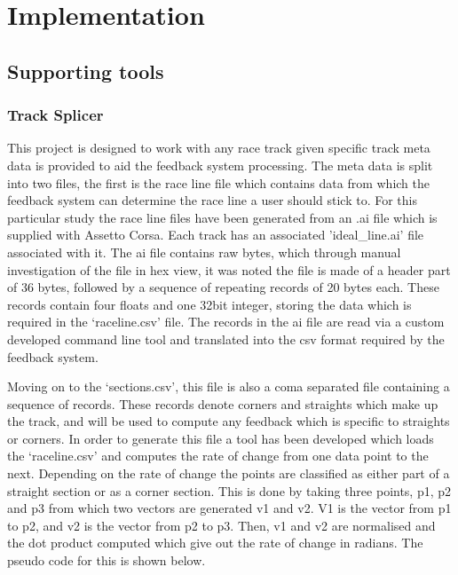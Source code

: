 \section{Implementation}

\subsection{Supporting tools}

\subsubsection{Track Splicer}
This project is designed to work with any race track given specific track meta data is provided to aid the feedback system processing. The meta data is split into two files, the first is the race line file which contains data from which the feedback system can determine the race line a user should stick to. 
 For this particular study the race line files have been generated from an .ai file which is supplied with Assetto Corsa. Each track has an associated 'ideal\_line.ai' file associated with it. The ai file contains raw bytes, which through manual investigation of the file in hex view, it was noted the file is made of a header part of 36 bytes, followed by a sequence of repeating records of 20 bytes each. These records contain four floats and one 32bit integer, storing the data which is required in the ‘raceline.csv’ file. The records in the ai file are read via a custom developed command line tool and translated into the csv format required by the feedback system. 	

Moving on to the ‘sections.csv’, this file is also a coma separated file containing a sequence of records. These records denote corners and straights which make up the track, and will be used to compute any feedback which is specific to straights or corners. In order to generate this file a tool has been developed which loads the ‘raceline.csv’ and computes the rate of change from one data point to the next. Depending on the rate of change the points are classified as either part of a straight section or as a corner section. This is done by taking three points, p1, p2 and p3 from which two vectors are generated v1 and v2. V1 is the vector from p1 to p2, and v2 is the vector from p2 to p3. Then, v1 and v2 are normalised and the dot product computed which give out the rate of change in radians. The pseudo code for this is shown below.\\

